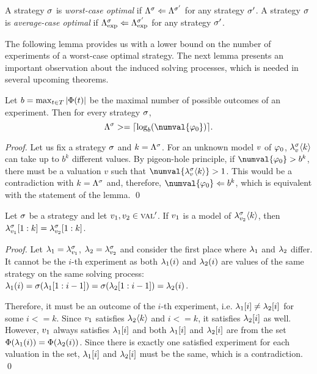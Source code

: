 \begin{definition}
A strategy $\sigma$ is \emph{worst-case optimal} if
  $\Lambda^{\sigma} <= \Lambda^{\sigma'}$ for any strategy $\sigma'$.
A strategy $\sigma$ is \emph{average-case optimal} if
  $\Lambda^{\sigma}_\textrm{exp} <= \Lambda^{\sigma'}_\textrm{exp}$ for any strategy $\sigma'$.
\end{definition}

The following lemma provides us with a lower bound on the number of
experiments of a worst-case optimal strategy.
The next lemma presents an important observation about the induced solving processes,
  which is needed in several upcoming theorems.

\begin{lemma} \label{lma:lbound}
Let $b = \max_{t\in T} |\Phi(t)|$ be the maximal number of
  possible outcomes of an experiment. Then for every strategy $\sigma$,
  \[
  \lenmax{\stg} >= \lceil \log_b(\numval{\init}) \rceil.
  \]
\end{lemma}

\begin{proof}
Let us fix a strategy $\sigma$ and $k = \Lambda^{\sigma}$.
For an unknown model $v$ of $\varphi_0$,
  $\lambda^{\sigma}_{v}\langle k\rangle$ can take up to
  $b^k$ different values.
By pigeon-hole principle, if $\numval{\init} > b^k$, there must be a valuation
  $v$ such that $\numval{\stgknow{\stg}{\val}{k}} > 1$.
This would be a contradiction with $k = \Lambda^{\sigma}$ and, therefore,
  $\numval{\init} <= b^k$, which is equivalent with the statement of the lemma.
  \qed
\end{proof}

\begin{lemma} \label{lma:accumulatedknowledge}
Let $\sigma$ be a strategy and let $v_1, v_2 \in\textsc{val}'$.
If $v_1$ is a model of $\lambda^{\sigma}_{v_2}\langle k\rangle$,
  then $\lambda^{\sigma}_{v_1}[1:k] = \lambda^{\sigma}_{v_2}[1:k]$.
\end{lemma}

\begin{proof}
Let $\lambda_1 = \lambda^{\sigma}_{v_1}$, $\lambda_2 = \lambda^{\sigma}_{v_2}$
and consider the first place where $\lambda_1$ and $\lambda_2$ differ.
It cannot be the $i$-th experiment as both $\lambda_1(i)$ and $\lambda_2(i)$
  are values of the same strategy on the same solving process:
$\lambda_1(i) = \sigma(\lambda_1[1:i-1]) =
              \sigma(\lambda_2[1:i-1]) = \lambda_2(i)$.

Therefore, it must be an outcome of the $i$-th experiment,
  i.e. $\lambda_1[i] \not= \lambda_2[i]$
  for some $i <= k$.
Since $v_1$ satisfies $\lambda_2\langle k\rangle$ and $i <= k$,
  it satisfies $\lambda_2[i]$ as well.
However, $v_1$ always satisfies $\lambda_1[i]$ and
  both $\lambda_1[i]$ and $\lambda_2[i]$ are from the set
  $\Phi(\lambda_1(i)) = \Phi(\lambda_2(i))$.
Since there is exactly one satisfied experiment for each valuation in the set,
  $\lambda_1[i]$ and $\lambda_2[i]$ must be the same, which is
  a contradiction. \qed
\end{proof}

